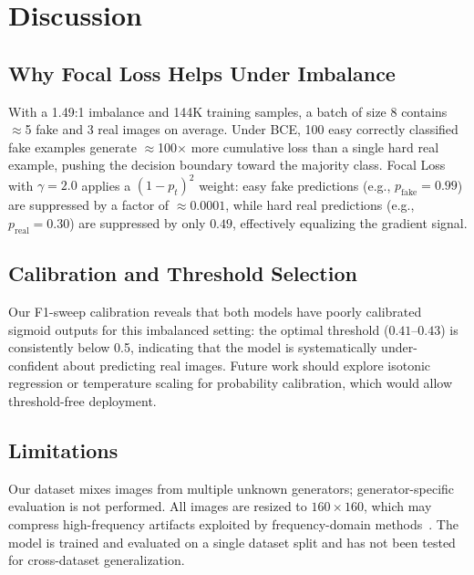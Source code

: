 \documentclass[10pt,twocolumn]{article}
\begin{document}
\section{Discussion}
\label{sec:discussion}

\subsection{Why Focal Loss Helps Under Imbalance}

With a 1.49:1 imbalance and 144K training samples, a batch of size 8 contains
$\approx$5 fake and 3 real images on average. Under BCE, 100 easy correctly
classified fake examples generate $\approx$100$\times$ more cumulative loss
than a single hard real example, pushing the decision boundary toward the
majority class. Focal Loss with $\gamma{=}2.0$ applies a $(1-p_t)^2$ weight:
easy fake predictions (e.g., $p_{\text{fake}}{=}0.99$) are suppressed by a
factor of $\approx 0.0001$, while hard real predictions (e.g., $p_{\text{real}}{=}0.30$)
are suppressed by only $0.49$, effectively equalizing the gradient signal.

\subsection{Calibration and Threshold Selection}

Our F1-sweep calibration reveals that both models have poorly calibrated
sigmoid outputs for this imbalanced setting: the optimal threshold
($0.41$--$0.43$) is consistently below 0.5, indicating that the model is
systematically under-confident about predicting real images.
Future work should explore isotonic regression or temperature scaling
for probability calibration, which would allow threshold-free deployment.

\subsection{Limitations}

Our dataset mixes images from multiple unknown generators; generator-specific
evaluation is not performed. All images are resized to $160{\times}160$,
which may compress high-frequency artifacts exploited by frequency-domain
methods~\cite{frank2020frequency}. The model is trained and evaluated on
a single dataset split and has not been tested for cross-dataset generalization.

\end{document}
